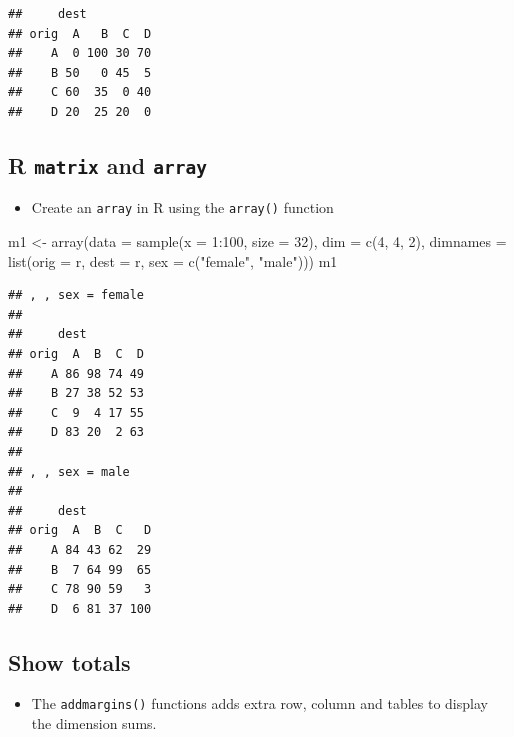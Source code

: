 \documentclass[
]{book}
\newenvironment{Shaded}{\begin{snugshade}}{\end{snugshade}}
\newcommand{\AttributeTok}[1]{\textcolor[rgb]{0.77,0.63,0.00}{#1}}
\newcommand{\DecValTok}[1]{\textcolor[rgb]{0.00,0.00,0.81}{#1}}
\newcommand{\FunctionTok}[1]{\textcolor[rgb]{0.00,0.00,0.00}{#1}}
\newcommand{\NormalTok}[1]{#1}
\newcommand{\OtherTok}[1]{\textcolor[rgb]{0.56,0.35,0.01}{#1}}
\newcommand{\SpecialCharTok}[1]{\textcolor[rgb]{0.00,0.00,0.00}{#1}}
\newcommand{\StringTok}[1]{\textcolor[rgb]{0.31,0.60,0.02}{#1}}
\providecommand{\tightlist}{%
  \setlength{\itemsep}{0pt}\setlength{\parskip}{0pt}}
\begin{document}
\begin{verbatim}
##     dest
## orig  A   B  C  D
##    A  0 100 30 70
##    B 50   0 45  5
##    C 60  35  0 40
##    D 20  25 20  0
\end{verbatim}

\hypertarget{r-matrix-and-array-1}{%
\subsection{\texorpdfstring{R \texttt{matrix} and \texttt{array}}{R matrix and array}}\label{r-matrix-and-array-1}}

\begin{itemize}
\tightlist
\item
  Create an \texttt{array} in R using the \texttt{array()} function
\end{itemize}

\begin{Shaded}
\begin{Highlighting}[]
\NormalTok{m1 }\OtherTok{\textless{}{-}} \FunctionTok{array}\NormalTok{(}\AttributeTok{data =} \FunctionTok{sample}\NormalTok{(}\AttributeTok{x =} \DecValTok{1}\SpecialCharTok{:}\DecValTok{100}\NormalTok{, }\AttributeTok{size =} \DecValTok{32}\NormalTok{), }
            \AttributeTok{dim =} \FunctionTok{c}\NormalTok{(}\DecValTok{4}\NormalTok{, }\DecValTok{4}\NormalTok{, }\DecValTok{2}\NormalTok{), }
            \AttributeTok{dimnames =} \FunctionTok{list}\NormalTok{(}\AttributeTok{orig =}\NormalTok{ r, }\AttributeTok{dest =}\NormalTok{ r, }\AttributeTok{sex =} \FunctionTok{c}\NormalTok{(}\StringTok{"female"}\NormalTok{, }\StringTok{"male"}\NormalTok{)))}
\NormalTok{m1}
\end{Highlighting}
\end{Shaded}

\begin{verbatim}
## , , sex = female
## 
##     dest
## orig  A  B  C  D
##    A 86 98 74 49
##    B 27 38 52 53
##    C  9  4 17 55
##    D 83 20  2 63
## 
## , , sex = male
## 
##     dest
## orig  A  B  C   D
##    A 84 43 62  29
##    B  7 64 99  65
##    C 78 90 59   3
##    D  6 81 37 100
\end{verbatim}

\hypertarget{show-totals}{%
\subsection{Show totals}\label{show-totals}}

\begin{itemize}
\tightlist
\item
  The \texttt{addmargins()} functions adds extra row, column and tables to display the dimension sums.
\end{itemize}
\end{document}
